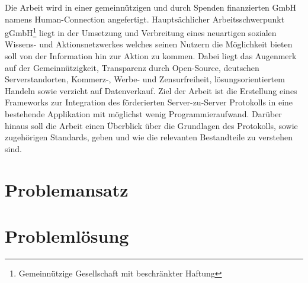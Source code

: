 {	Die Arbeit wird in einer gemeinnützigen und durch Spenden finanzierten GmbH namens Human-Connection angefertigt. Hauptsächlicher Arbeitsschwerpunkt gGmbH\footnote{Gemeinnützige Gesellschaft mit beschränkter Haftung} liegt in der Umsetzung und Verbreitung eines neuartigen sozialen Wissens- und Aktionsnetzwerkes welches seinen Nutzern die Möglichkeit bieten soll von der Information hin zur Aktion zu kommen. Dabei liegt das Augenmerk auf der Gemeinnützigkeit, Transparenz durch Open-Source, deutschen Serverstandorten, Kommerz-, Werbe- und Zensurfreiheit, lösungsorientiertem Handeln sowie verzicht auf Datenverkauf. Ziel der Arbeit ist die Erstellung eines Frameworks zur Integration des förderierten Server-zu-Server Protokolls in eine bestehende Applikation mit möglichst wenig Programmieraufwand. Darüber hinaus soll die Arbeit einen Überblick über die Grundlagen des Protokolls, sowie zugehörigen Standards, geben und wie die relevanten Bestandteile zu verstehen sind.
	\section{Problemansatz}
	\section{Problemlösung}
}


